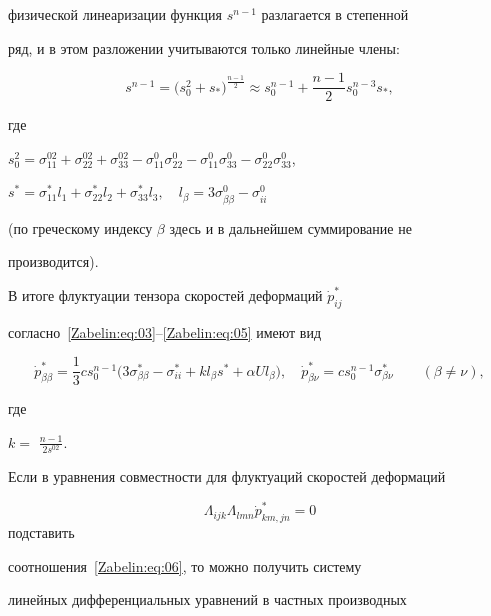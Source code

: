 физической линеаризации функция $s^{n-1}$ разлагается в степенной

ряд, и в этом разложении учитываются только линейные члены:

\begin{equation}\label{Zabelin:eq:05}

s^{n-1}=\big(s_0^2+s_*\big)^\frac{n-1}{2}\approx

s_0^{n-1}+\frac{n-1}{2}s_0^{n-3}s_*,

\end{equation}

где

$

s_0^2=\sigma_{11}^{02}+\sigma_{22}^{02}+\sigma_{33}^{02}-\sigma_{11}^0\sigma_{22}^0-\sigma_{11}^0\sigma_{33}^0-\sigma_{22}^0\sigma_{33}^0$,

$s^*=\sigma_{11}^*l_1+\sigma_{22}^*l_2+\sigma_{33}^*l_3,\quad

l_\beta=3\sigma_{\beta\beta}^0-\sigma_{ii}^0$

(по греческому индексу $\beta$ здесь и в дальнейшем суммирование не

производится).



В итоге флуктуации тензора скоростей деформаций $\dot{p}_{ij}^*$

согласно~\eqref{Zabelin:eq:03}--\eqref{Zabelin:eq:05} имеют вид

\begin{equation}\label{Zabelin:eq:06}

\dot{p}_{\beta\beta}^*=\frac13cs_0^{n-1}\big(3\sigma_{\beta\beta}^*-\sigma_{ii}^*+kl_\beta

s^*+\alpha Ul_\beta\big),\quad

\dot{p}^*_{\beta\nu}=cs_0^{n-1}\sigma_{\beta\nu}^*\qquad(\beta\neq\nu),

\end{equation}

где

$k=$ $\frac{n-1}{2s^{02}}$.





Если в уравнения совместности для флуктуаций скоростей деформаций

$$\Lambda_{ijk}\Lambda_{lmn}\dot{p}^*_{km,jn}=0$$ подставить

соотношения~\eqref{Zabelin:eq:06}, то можно получить систему

линейных дифференциальных уравнений в частных производных

